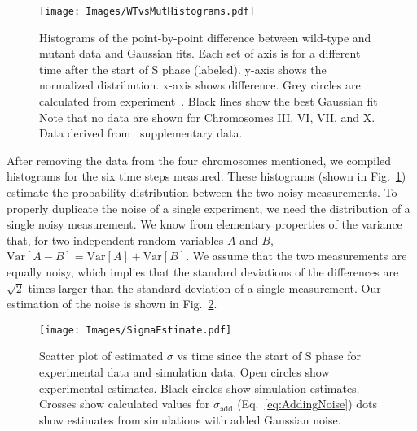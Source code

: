 		\begin{figure}[tbh]
			\begin{center}
				\texttt{[image: Images/WTvsMutHistograms.pdf]}
			\end{center}
				\caption[Estimating Experimental Noise B]{\label{fig:HistDifference} Histograms of the point-by-point difference between wild-type and mutant data and Gaussian fits.
					Each set of axis is for a different time after the start of S phase (labeled).
					y-axis shows the normalized distribution.
					x-axis shows difference.
					Grey circles are calculated from experiment~\cite{StochasticTermination}.
					Black lines show the best Gaussian fit
					Note that no data are shown for Chromosomes III, VI, VII, and X.
					Data derived from~\cite{StochasticTermination} supplementary data.
				}
		\end{figure}
		
		After removing the data from the four chromosomes mentioned, we compiled histograms for the six time steps measured.
		These histograms (shown in Fig.~\ref{fig:HistDifference}) estimate the probability distribution between the two noisy measurements.
		To properly duplicate the noise of a single experiment, we need the distribution of a single noisy measurement.
		We know from elementary properties of the variance that, for two independent random variables $A$ and $B$, $\text{Var}[A-B] = \text{Var}[A] + \text{Var}[B]$.
		We assume that the two measurements are equally noisy, which implies that the standard deviations of the differences are $\sqrt{2}$ times larger than the standard deviation of a single measurement.
		Our estimation of the noise is shown in Fig.~\ref{fig:Noise}.
		
		\begin{figure}[tbh]
			\begin{center}
				\texttt{[image: Images/SigmaEstimate.pdf]}
			\end{center}
				\caption[Estimated Simulation and Experimental Noise]{\label{fig:Noise} 
					Scatter plot of estimated $\sigma$ vs time since the start of S phase for experimental data and simulation data.
					Open circles show experimental estimates.
					Black circles show simulation estimates.
					Crosses show calculated values for $\sigma_\text{add}$ (Eq.~\ref{eq:AddingNoise})
					dots show estimates from simulations with added Gaussian noise.
				}
		\end{figure}
		
